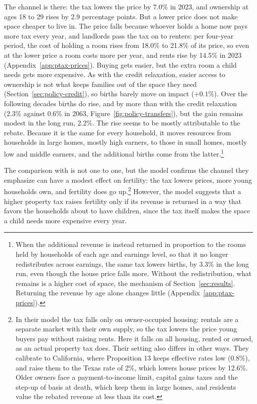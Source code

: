 The channel is there: the tax lowers the price by 7.0\% in 2023, and
ownership at ages 18 to 29 rises by 2.9 percentage points. But a lower price
does not make space cheaper to live in. The price falls because whoever holds
a home now pays more tax every year, and landlords pass the tax on to renters:
per four-year period, the cost of holding a room rises from 18.0\% to 21.8\%
of its price, so even at the lower price a room costs more per year, and rents
rise by 14.5\% in 2023 (Appendix~\ref{app:ptax-prices}). Buying gets easier, but the extra room a child needs
gets more expensive. As with the credit relaxation, easier access to ownership
is not what keeps families out of the space they need
(Section~\ref{sec:policy-credit}), so births barely move on impact
($+0.1\%$). Over the following decades births do rise, and by more than with
the credit relaxation (2.3\% against 0.6\% in 2063,
Figure~\ref{fig:policy-transfers}), but the gain remains modest in the long
run, 2.2\%. The rise seems to be mostly attributable to the rebate.
Because it is the same for every household, it moves resources from households
in large homes, mostly high earners, to those in small homes, mostly low and
middle earners, and the additional births come from the
latter.\footnote{When the additional revenue is instead returned in proportion
to the rooms held by households of each age and earnings level, so that it no
longer redistributes across earnings, the same tax lowers births, by 3.3\% in
the long run, even though the house price falls more. Without the
redistribution, what remains is a higher cost of space, the mechanism of
Section~\ref{sec:results}. Returning the revenue by age alone changes
little (Appendix~\ref{app:ptax-prices}).}

The comparison with \citet{coven2026} is not one to one, but the model
confirms the channel they emphasize can have a modest effect on fertility: the tax lowers prices, more young
households own, and fertility does go up.\footnote{In their model the tax falls only on owner-occupied
housing: rentals are a separate market with their own supply, so the tax
lowers the price young buyers pay without raising rents. Here it falls on all
housing, rented or owned, as an actual property tax does. Their setting also
differs in other ways. They calibrate to California, where Proposition 13
keeps effective rates low (0.8\%), and raise them to the Texas rate of 2\%,
which lowers house prices by 12.6\%. Older owners face a
payment-to-income limit, capital gains taxes and the step-up of basis at
death, which keep them in large homes, and residents value the rebated
revenue at less than its cost.} However, the model suggests that a higher
property tax raises fertility only if its revenue is returned in a way that
favors the households about to have children, since the tax itself makes the
space a child needs more expensive every year.

